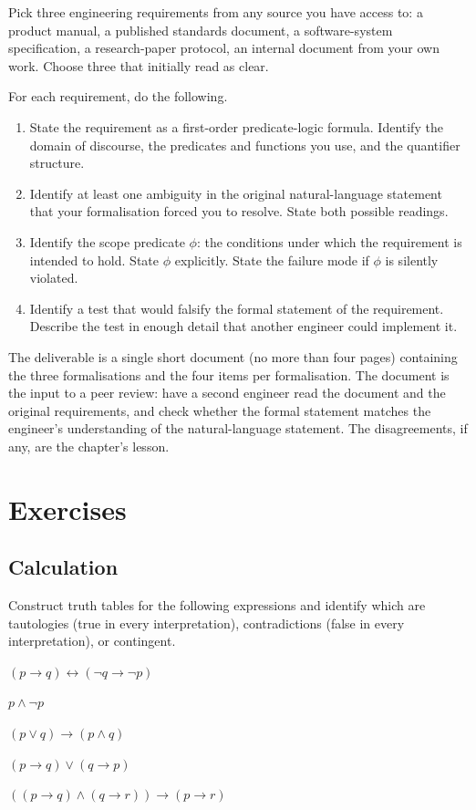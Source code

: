 \begin{project}
Pick three engineering requirements from any source you have access to: a product manual, a published standards document, a software-system specification, a research-paper protocol, an internal document from your own work. Choose three that initially read as clear.

For each requirement, do the following.

\begin{enumerate}[leftmargin=*]
  \item State the requirement as a first-order predicate-logic formula. Identify the domain of discourse, the predicates and functions you use, and the quantifier structure.
  \item Identify at least one ambiguity in the original natural-language statement that your formalisation forced you to resolve. State both possible readings.
  \item Identify the scope predicate $\phi$: the conditions under which the requirement is intended to hold. State $\phi$ explicitly. State the failure mode if $\phi$ is silently violated.
  \item Identify a test that would falsify the formal statement of the requirement. Describe the test in enough detail that another engineer could implement it.
\end{enumerate}

The deliverable is a single short document (no more than four pages) containing the three formalisations and the four items per formalisation. The document is the input to a peer review: have a second engineer read the document and the original requirements, and check whether the formal statement matches the engineer's understanding of the natural-language statement. The disagreements, if any, are the chapter's lesson.
\end{project}

\section{Exercises}

\subsection*{Calculation}

\begin{exercise}
Construct truth tables for the following expressions and identify which are tautologies (true in every interpretation), contradictions (false in every interpretation), or contingent.
\begin{enumerate*}[label=(\alph*)]
\item $(p \to q) \leftrightarrow (\lnot q \to \lnot p)$
\item $p \wedge \lnot p$
\item $(p \vee q) \to (p \wedge q)$
\item $(p \to q) \vee (q \to p)$
\item $((p \to q) \wedge (q \to r)) \to (p \to r)$
\end{enumerate*}
\end{exercise}

